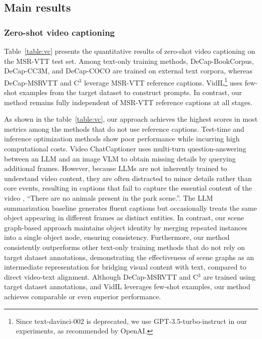 








\subsection{Main results}
\subsubsection{Zero-shot video captioning}

Table~\ref{table:vc} presents the quantitative results of zero-shot video captioning on the MSR-VTT test set. 
Among text-only training methods, DeCap-BookCorpus, DeCap-CC3M, and DeCap-COCO are trained on external text corpora, whereas DeCap-MSRVTT and C$^{3}$ leverage MSR-VTT reference captions. VidIL\footnote{Since text-davinci-002 is deprecated, we use GPT-3.5-turbo-instruct in our experiments, as recommended by OpenAI.} uses few-shot examples from the target dataset to construct prompts. 
In contrast, our method remains fully independent of MSR-VTT reference captions at all stages.

As shown in the table~\ref{table:vc}, our approach achieves the highest scores in most metrics among the methods that do not use reference captions.
Test-time and inference optimization methods show poor performance while incurring high computational costs.
Video ChatCaptioner uses multi-turn question-answering between an LLM and an image VLM to obtain missing details by querying additional frames.
However, because LLMs are not inherently trained to understand video content, they are often distracted to minor details rather than core events, resulting in captions that fail to capture the essential content of the video \eg, “There are no animals present in the park scene.”.
The LLM summarization baseline generates fluent captions but occasionally treats the same object appearing in different frames as distinct entities. 
In contrast, our scene graph-based approach maintains object identity by merging repeated instances into a single object node, ensuring consistency.
Furthermore, our method consistently outperforms other text-only training methods that do not rely on target dataset annotations, demonstrating the effectiveness of scene graphs as an intermediate representation for bridging visual content with text, compared to direct video-text alignment.
Although DeCap-MSRVTT and C$^{3}$ are trained using target dataset annotations, and VidIL leverages few-shot examples, our method achieves comparable or even superior performance.

